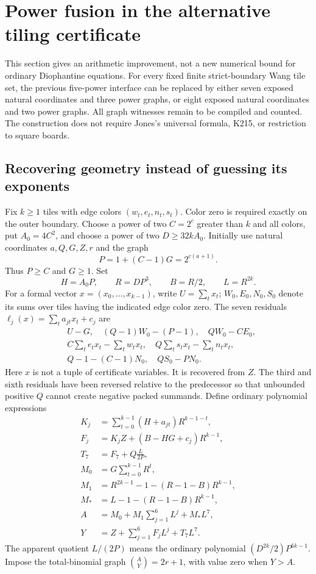 \section{Power fusion in the alternative tiling certificate}
\label{sec:power-fused-tiling}

This section gives an arithmetic improvement, not a new numerical bound for
ordinary Diophantine equations. For every fixed finite strict-boundary Wang
tile set, the previous five-power interface can be replaced by either
seven exposed natural coordinates and three power graphs, or eight exposed
natural coordinates and two power graphs. All graph witnesses remain to be
compiled and counted. The construction does not require Jones's universal
formula, K215, or restriction to square boards.

\subsection{Recovering geometry instead of guessing its exponents}
Fix $k\geq1$ tiles with edge colors $(w_t,e_t,n_t,s_t)$. Color zero is
required exactly on the outer boundary. Choose a power of two $C=2^c$
greater than $k$ and all colors, put $A_0=4C^2$, and choose a power of two
$D\geq32kA_0$. Initially use natural coordinates $a,Q,G,Z,r$ and the graph
\[
 P=1+(C-1)G=2^{c(a+1)}.
\]
Thus $P\geq C$ and $G\geq1$. Set
\[
 H=A_0P,\qquad R=DP^3,\qquad B=R/2,\qquad L=R^{2k}.
\]
For a formal vector $x=(x_0,\ldots,x_{k-1})$, write $U=\sum_t x_t$;
$W_0,E_0,N_0,S_0$ denote its sums over tiles having the indicated edge
color zero. The seven residuals $\ell_j(x)=\sum_t a_{jt}x_t+c_j$ are
\[
\begin{aligned}
&U-G,\quad (Q-1)W_0-(P-1),\quad QW_0-CE_0,\\
&C\sum_t e_tx_t-\sum_t w_tx_t,\quad
 Q\sum_t s_tx_t-\sum_t n_tx_t,\\
&Q-1-(C-1)N_0,\quad QS_0-PN_0.
\end{aligned}
\]
Here $x$ is not a tuple of certificate variables. It is recovered from $Z$.
The third and sixth residuals have been reversed relative to the predecessor
so that unbounded positive $Q$ cannot create negative packed summands.
Define ordinary polynomial expressions
\[
\begin{aligned}
 K_j&=\sum_{t=0}^{k-1}(H+a_{jt})R^{k-1-t},\\
 F_j&=K_jZ+(B-HG+c_j)R^{k-1},\\
 T_7&=F_7+Q\frac{L}{2P},\\
 M_0&=G\sum_{t=0}^{k-1}R^t,\\
 M_1&=R^{2k-1}-1-(R-1-B)R^{k-1},\\
 M_*&=L-1-(R-1-B)R^{k-1},\\
 A&=M_0+M_1\sum_{j=1}^{6}L^j+M_*L^7,\\
 Y&=Z+\sum_{j=1}^{6}F_jL^j+T_7L^7.
\end{aligned}
\]
The apparent quotient $L/(2P)$ means the ordinary polynomial
$(D^{2k}/2)P^{6k-1}$. Impose the total-binomial graph
$\binom AY=2r+1$, with value zero when $Y>A$.

